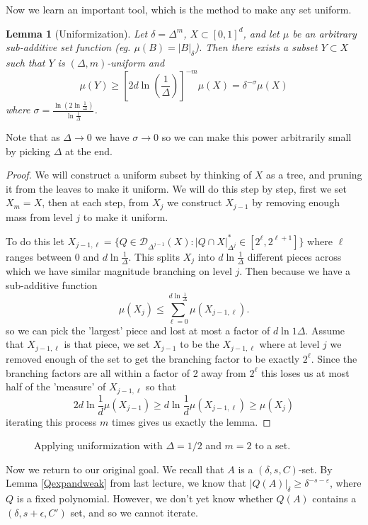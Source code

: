 \documentclass[12pt]{amsart}
\newtheorem{lemma}[theorem]{Lemma}
\begin{document}
Now we learn an important tool, which is the method to make any set uniform.
\begin{lemma}[Uniformization]
    Let $\delta = \Delta^m$, $X \subset [0,1]^d$, and let $\mu$ be an arbitrary sub-additive set function (eg. $\mu(B) = |B|_\delta$). Then there exists a subset $Y \subset X$ such that $Y$ is $(\Delta,m)$-uniform and
    $$
    \mu(Y) \geq \left[2 d \ln\left(\frac{1}{\Delta}\right)\right]^{-m} \mu(X) = \delta^{- \sigma} \mu(X)
    $$
    where $\sigma = \frac{\ln(2 \ln \frac{1}{\Delta})}{\ln \frac{1}{\Delta}}$.
\end{lemma}
Note that as $\Delta \to 0$ we have $\sigma \to 0$ so we can make this power arbitrarily small by picking $\Delta$ at the end.
\begin{proof}
    We will construct a uniform subset by thinking of $X$ as a tree, and pruning it from the leaves to make it uniform. We will do this step by step, first we set $X_m = X$, then at each step, from $X_j$ we construct $X_{j-1}$ by removing enough mass from level $j$ to make it uniform. 

    To do this let $X_{j-1, \ell} = \{Q \in \mathcal{D}_{\Delta^{j-1}}(X) : |Q \cap X|_{\Delta^j}^* \in [2^\ell, 2^{\ell+1}] \}$ where $\ell$ ranges between $0$ and $d \ln \frac{1}{\Delta}$. This splits $X_j$ into $d \ln \frac{1}{\Delta}$ different pieces across which we have similar magnitude branching on level $j$. 
    Then because we have a sub-additive function
    $$
    \mu(X_j) \leq \sum_{\ell=0}^{d \ln \frac{1}{\Delta}} \mu(X_{j-1, \ell}).
    $$
    so we can pick the 'largest' piece and lost at most a factor of $d \ln{1}{\Delta}$. Assume that $X_{j-1,\ell}$ is that piece, we set $X_{j-1}$ to be the $X_{j-1,\ell}$ where at level $j$ we removed enough of the set to get the branching factor to be exactly $2^\ell$. Since the branching factors are all within a factor of 2 away from $2^\ell$ this loses us at most half of the 'measure' of $X_{j-1,\ell}$ so that 
    $$
        2 d \ln \frac{1}{d} \mu(X_{j-1}) \geq d \ln \frac{1}{d} \mu(X_{j-1, \ell}) \geq \mu(X_{j})
    $$
    iterating this process $m$ times gives us exactly the lemma.
\end{proof}
\begin{figure}[h]
    \centering
    
    \caption{Applying uniformization with $\Delta = 1/2$ and $m = 2$ to a set.}
    \label{fig:uniformization}
\end{figure}

\vskip500pt

Now we return to our original goal.  We recall that $A$ is a $(\delta,s,C)$-set.   By Lemma \ref{Qexpandweak} from last lecture,  we know that
$|Q(A)|_\delta \geq \delta^{-s-\varepsilon}$,  where $Q$ is a fixed polynomial.   However,  we don't yet know whether $Q(A)$ contains a $(\delta,  s+\epsilon,  C')$ set,  and so we cannot iterate.
\end{document}

